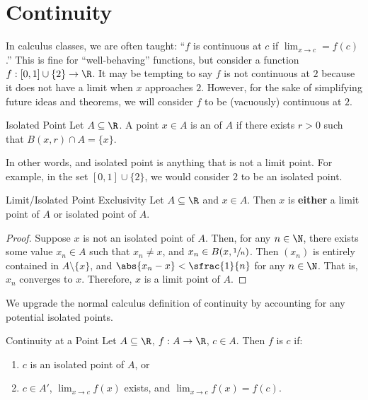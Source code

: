 \chapter{Continuity}

In calculus classes, we are often taught: ``$f$ is continuous at $c$ if $\lim_{x \to c} = f(c)$.'' This is fine for ``well-behaving'' functions, but consider a function $f : [0,1] \cup \{2\} \to \R$. It may be tempting to say $f$ is not continuous at $2$ because it does not have a limit when $x$ approaches $2$. However, for the sake of simplifying future ideas and theorems, we will consider $f$ to be (vacuously) continuous at $2$.

\begin{dfnbox}{Isolated Point}{}
    Let $A \subseteq \R$. A point $x \in A$ is an  of $A$ if there exists $r > 0$ such that $B(x,r) \cap A = \{x\}$.
\end{dfnbox}

In other words, and isolated point is anything that is not a limit point. For example, in the set $[0,1] \cup \{2\}$, we would consider $2$ to be an isolated point.

\begin{lembox}{Limit/Isolated Point Exclusivity}{}
    Let $A \subseteq \R$ and $x \in A$. Then $x$ is \textbf{either} a limit point of $A$ or isolated point of $A$.
    \tcblower
    \begin{proof}
        Suppose $x$ is not an isolated point of $A$. Then, for any $n \in \N$, there exists some value $x_n \in A$ such that $x_n \neq x$, and $x_n \in B(x, \sfrac{1}{n})$. Then $(x_n)$ is entirely contained in $A \setminus \{x\}$, and $\abs{x_n - x} < \sfrac{1}{n}$ for any $n \in \N$. That is, $x_n$ converges to $x$. Therefore, $x$ is a limit point of $A$.
    \end{proof}
\end{lembox}

We upgrade the normal calculus definition of continuity by accounting for any potential isolated points.

\begin{dfnbox}{Continuity at a Point}{}
    Let $A \subseteq \R$, $f : A \to \R$, $c \in A$. Then $f$ is  $c$ if:
    \begin{enumerate}
        \item $c$ is an isolated point of $A$, or
        \item $c \in A\prime$, $\lim_{x \to c} f(x)$ exists, and $\lim_{x \to c} f(x) = f(c)$.
    \end{enumerate}
\end{dfnbox}

